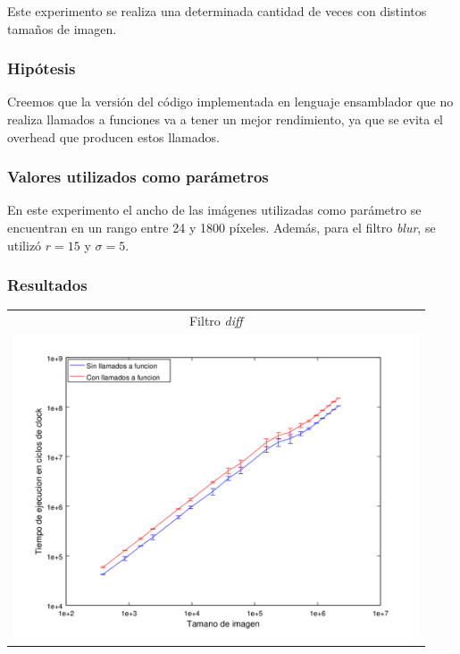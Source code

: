 		Este experimento se realiza una determinada cantidad de veces con distintos tamaños de imagen.

			\subsubsection*{Hipótesis} 
				Creemos que la versión del código implementada en lenguaje ensamblador que no realiza llamados a funciones va a tener un mejor rendimiento, ya que se evita el overhead que producen estos llamados.
		
			\subsubsection*{Valores utilizados como parámetros} 
				En este experimento el ancho de las imágenes utilizadas como parámetro se encuentran en un rango entre 24 y 1800 píxeles. Además, para el filtro \emph{blur}, se utilizó $r = 15$ y $\sigma = 5$.

			\subsubsection*{Resultados}
				{\centering \begin{tabular}{c}
		      		{\small Filtro \emph{diff}} \\
		      		\includegraphics[width=12cm]{../exp/graficos/exp4-diff-c_vs_c2.png} \\
		    	\end{tabular}}

